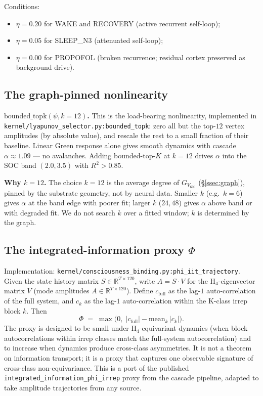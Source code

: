 Conditions:
\begin{itemize}\itemsep=2pt
\item $\eta = 0.20$ for WAKE and RECOVERY (active recurrent self-loop);
\item $\eta = 0.05$ for SLEEP\_N3 (attenuated self-loop);
\item $\eta = 0.00$ for PROPOFOL (broken recurrence; residual cortex
  preserved as background drive).
\end{itemize}

\subsection{The graph-pinned nonlinearity}

\textbf{$\mathrm{bounded\_topk}(\psi, k=12)$.} This is the load-bearing
nonlinearity, implemented in
\texttt{kernel/lyapunov\_selector.py:bounded\_topk}: zero all but the
top-$12$ vertex amplitudes (by absolute value), and rescale the rest
to a small fraction of their baseline. Linear Green response alone
gives smooth dynamics with cascade $\alpha\approx 1.09$ — no
avalanches. Adding bounded-top-$K$ at $k=12$ drives $\alpha$ into the
SOC band $(2.0, 3.5)$ with $R^{2}>0.85$.

\textbf{Why $k=12$.} The choice $k=12$ is the average degree of
$G_{V_{600}}$ (\S\ref{ssec:graph}), pinned by the substrate
geometry, not by neural data. Smaller $k$ (e.g.\ $k=6$) gives $\alpha$
at the band edge with poorer fit; larger $k$ ($24, 48$) gives $\alpha$
above band or with degraded fit. We do not search $k$ over a fitted
window; $k$ is determined by the graph.

\subsection{The integrated-information proxy
            \texorpdfstring{$\Phi$}{Phi}}

Implementation:
\texttt{kernel/consciousness\_binding.py:phi\_iit\_trajectory}.
Given the state history matrix $S\in\mathbb{R}^{T\times 120}$, write
$A = S\cdot V$ for the H$_4$-eigenvector matrix $V$ (mode amplitudes
$A\in\mathbb{R}^{T\times 120}$). Define $c_{\mathrm{full}}$ as the
lag-$1$ auto-correlation of the full system, and $c_{k}$ as the
lag-$1$ auto-correlation within the K-class irrep block $k$. Then
\[
\Phi \;=\; \max\!\bigl(0,\; |c_{\mathrm{full}}| - \mathrm{mean}_{k}\,|c_{k}|\bigr).
\]
The proxy is designed to be small under H$_{4}$-equivariant dynamics
(when block autocorrelations within irrep classes match the full-system
autocorrelation) and to increase when dynamics produce cross-class
asymmetries. It is not a theorem on information transport; it is a
proxy that captures one observable signature of cross-class
non-equivariance. This is a port of the published
\texttt{integrated\_information\_phi\_irrep} proxy from the cascade
pipeline, adapted to take amplitude trajectories from any source.

